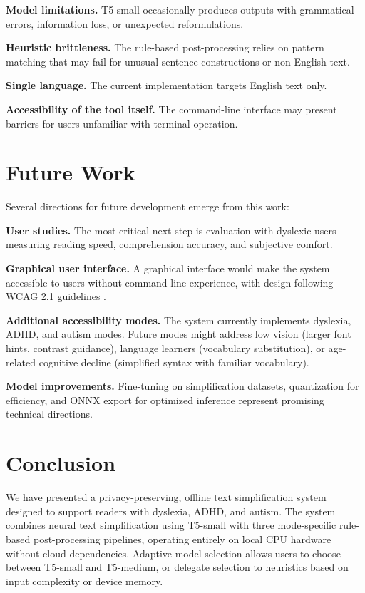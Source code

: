 \documentclass[11pt]{article}
\begin{document}
\textbf{Model limitations.} T5-small occasionally produces outputs with grammatical errors, information loss, or unexpected reformulations.

\textbf{Heuristic brittleness.} The rule-based post-processing relies on pattern matching that may fail for unusual sentence constructions or non-English text.

\textbf{Single language.} The current implementation targets English text only.

\textbf{Accessibility of the tool itself.} The command-line interface may present barriers for users unfamiliar with terminal operation.

\section{Future Work}

Several directions for future development emerge from this work:

\textbf{User studies.} The most critical next step is evaluation with dyslexic users measuring reading speed, comprehension accuracy, and subjective comfort.

\textbf{Graphical user interface.} A graphical interface would make the system accessible to users without command-line experience, with design following WCAG 2.1 guidelines \citep{wcag2018}.

\textbf{Additional accessibility modes.} The system currently implements dyslexia, ADHD, and autism modes. Future modes might address low vision (larger font hints, contrast guidance), language learners (vocabulary substitution), or age-related cognitive decline (simplified syntax with familiar vocabulary).

\textbf{Model improvements.} Fine-tuning on simplification datasets, quantization for efficiency, and ONNX export for optimized inference represent promising technical directions.

\section{Conclusion}

We have presented a privacy-preserving, offline text simplification system designed to support readers with dyslexia, ADHD, and autism. The system combines neural text simplification using T5-small with three mode-specific rule-based post-processing pipelines, operating entirely on local CPU hardware without cloud dependencies. Adaptive model selection allows users to choose between T5-small and T5-medium, or delegate selection to heuristics based on input complexity or device memory.
\end{document}
